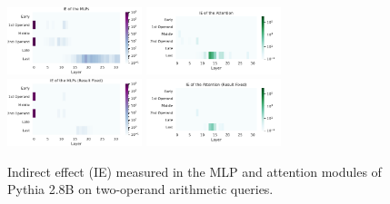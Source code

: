\documentclass[11pt]{article}
\begin{document}
\begin{figure}[ht]
    \centering
    \includegraphics[width=0.35\textwidth]{img/pythia/pythia-mlp.pdf}
    \includegraphics[width=0.35\textwidth]{img/pythia/pythia-attn.pdf}
    \includegraphics[width=0.35\textwidth]{img/pythia/pythia-mlp-int2.pdf}
    \includegraphics[width=0.35\textwidth]{img/pythia/pythia-attn-int2.pdf}
    \caption{Indirect effect (IE) measured in the MLP and attention modules of Pythia 2.8B on two-operand arithmetic queries.}
    \label{fig:pyhtia}
\end{figure}
\end{document}
